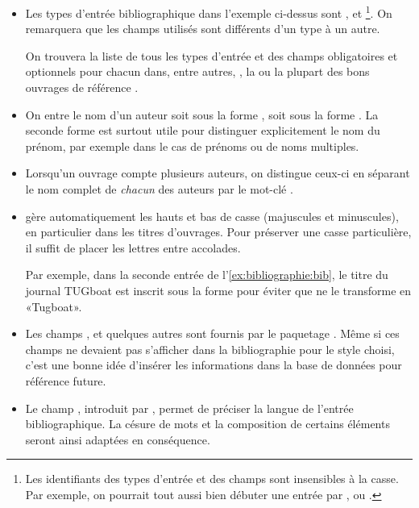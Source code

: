 \begin{itemize}
\item Les types d'entrée bibliographique dans l'exemple ci-dessus sont
  ,  et \footnote{%
    Les identifiants des types d'entrée et des champs sont insensibles
    à la casse. Par exemple, on pourrait tout aussi bien débuter une
    entrée par ,  ou .}. %
  On remarquera que les champs utilisés sont différents d'un type à un
  autre.

  On trouvera la liste de tous les types d'entrée et des champs
  obligatoires et optionnels pour chacun dans, entre autres, %
  , %
  la %
  ou la plupart des bons ouvrages de référence
  \citep[comme][]{Kopka:latex:4e}.
\item On entre le nom d'un auteur soit sous la forme , soit sous la forme . La seconde
  forme est surtout utile pour distinguer explicitement le nom du
  prénom, par exemple dans le cas de prénoms ou de noms multiples.
\item Lorsqu'un ouvrage compte plusieurs auteurs, on distingue ceux-ci
  en séparant le nom complet de \emph{chacun} des auteurs par le
  mot-clé .
\item {\BibTeX} gère automatiquement les hauts et bas de
  casse (majuscules et minuscules), en particulier dans les titres
  d'ouvrages. Pour préserver une casse particulière, il suffit de
  placer les lettres entre accolades.

  Par exemple, dans la seconde entrée de
  l'\autoref{ex:bibliographie:bib}, le titre du journal TUGboat est
  inscrit sous la forme  pour éviter que {\BibTeX}
  ne le transforme en «Tugboat».
\item Les champs ,  et quelques autres
  \citep[section~2.8]{natbib} sont fournis par le paquetage
  . Même si ces champs ne devaient pas s'afficher dans la
  bibliographie pour le style choisi, c'est une bonne idée d'insérer
  les informations dans la base de données pour référence future.
\item Le champ , introduit par , permet de
  préciser la langue de l'entrée bibliographique. La césure de mots et
  la composition de certains éléments seront ainsi adaptées en
  conséquence.


\end{itemize}
